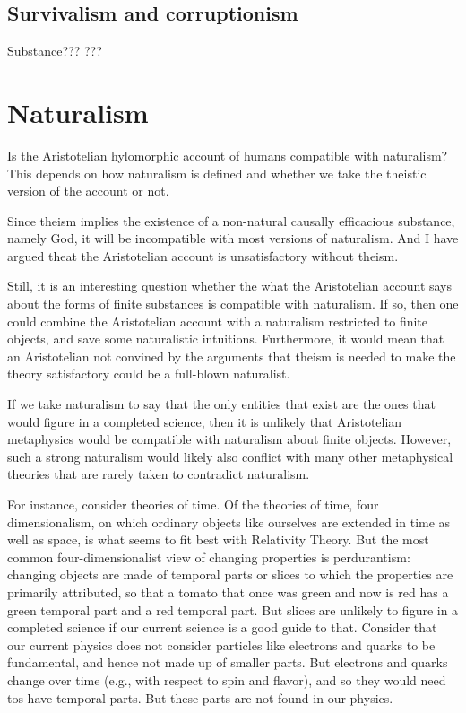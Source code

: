 \subsection{Survivalism and corruptionism}
Substance???
???

\section{Naturalism}
Is the Aristotelian hylomorphic account of humans compatible with naturalism? This depends on how naturalism
is defined and whether we take the theistic version of the account or not.

Since theism implies the existence of a non-natural causally efficacious substance, namely God, it will be incompatible
with most versions of naturalism. And I have argued theat the Aristotelian account is unsatisfactory without
theism. 

Still, it is an interesting question whether the what the Aristotelian account says about the forms of finite
substances is compatible with naturalism. If so, then one could combine the Aristotelian account with 
a naturalism restricted to finite objects, and save some naturalistic intuitions. Furthermore, it would mean
that an Aristotelian not convined by the arguments that theism is needed to make the theory satisfactory could
be a full-blown naturalist.

If we take naturalism to say that the only entities that exist are the ones that would figure in a completed science,
then it is unlikely that Aristotelian metaphysics would be compatible with naturalism about finite objects. However,
such a strong naturalism would likely also conflict with many other metaphysical theories that are rarely taken to 
contradict naturalism. 

For instance, consider theories of time. Of the theories of time, four dimensionalism, on which
ordinary objects like ourselves are extended in time as well as space, is what seems to fit best with Relativity Theory. 
But the most common four-dimensionalist view of changing properties is perdurantism: changing objects are made of temporal parts or
slices to which the properties are primarily attributed, so that a tomato that once was green and now is red has a green temporal part
and a red temporal part. But slices are unlikely to figure in a completed science if
our current science is a good guide to that. Consider that our current physics does not consider particles
like electrons and quarks to be fundamental, and hence not made up of smaller parts. But electrons and quarks change over
time (e.g., with respect to spin and flavor), and so they would need tos have temporal parts.  But these parts are not found
in our physics. 

